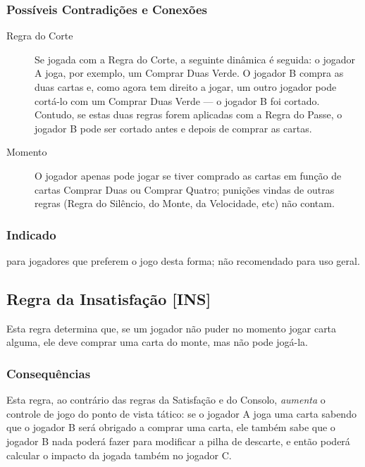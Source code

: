 \subsubsection{Possíveis Contradições e Conexões}

\begin{description}
\item[Regra do Corte]{Se jogada com a Regra do Corte, a seguinte dinâmica é seguida: o jogador A joga, por exemplo, um Comprar Duas Verde. O jogador B compra as duas cartas e, como agora tem direito a jogar, um outro jogador pode cortá-lo com um Comprar Duas Verde --- o jogador B foi cortado. Contudo, se estas duas regras forem aplicadas com a Regra do Passe, o jogador B pode ser cortado antes e depois de comprar as cartas.}
\item[Momento]{O jogador apenas pode jogar se tiver comprado as cartas em função de cartas Comprar Duas ou Comprar Quatro; punições vindas de outras regras (Regra do Silêncio, do Monte, da Velocidade, etc) não contam.}
\end{description}

\subsubsection{Indicado} 

para jogadores que preferem o jogo desta forma; não recomendado para uso geral.

\subsection{Regra da Insatisfação [INS]}

\label{insatisfacao}

Esta regra determina que, se um jogador não puder no momento jogar carta alguma, ele deve comprar uma carta do monte, mas não pode jogá-la.

\subsubsection{Consequências}

Esta regra, ao contrário das regras da Satisfação e do Consolo, \emph{aumenta} o controle de jogo do ponto de vista tático: se o jogador A joga uma carta sabendo que o jogador B será obrigado a comprar uma carta, ele também sabe que o jogador B nada poderá fazer para modificar a pilha de descarte, e então poderá calcular o impacto da jogada também no jogador C.

